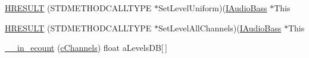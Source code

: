 \begin{DoxyCompactItemize}
\item 
\hyperlink{struct_i_audio_bass_vtbl_a72ed700e53d743e1690e9d3875e1779d}{H\+R\+E\+S\+U\+LT} (S\+T\+D\+M\+E\+T\+H\+O\+D\+C\+A\+L\+L\+T\+Y\+PE $\ast$Set\+Level\+Uniform)(\hyperlink{devicetopology_8h_a5f8da29f8b1203453acf3cff3f6b7603}{I\+Audio\+Bass} $\ast$This
\item 
\hyperlink{struct_i_audio_bass_vtbl_a24eec3d28a9b80bd1b08fa2d0ce77d73}{H\+R\+E\+S\+U\+LT} (S\+T\+D\+M\+E\+T\+H\+O\+D\+C\+A\+L\+L\+T\+Y\+PE $\ast$Set\+Level\+All\+Channels)(\hyperlink{devicetopology_8h_a5f8da29f8b1203453acf3cff3f6b7603}{I\+Audio\+Bass} $\ast$This
\item 
\hyperlink{struct_i_audio_bass_vtbl_a967152b42cd57947fb8f63e26ec9b13c}{\+\_\+\+\_\+in\+\_\+ecount} (\hyperlink{struct_i_audio_bass_vtbl_a941e5705f3980d5e5cd62ba18e5e8e9d}{c\+Channels}) float a\+Levels\+DB\mbox{[}$\,$\mbox{]}
\end{DoxyCompactItemize}
